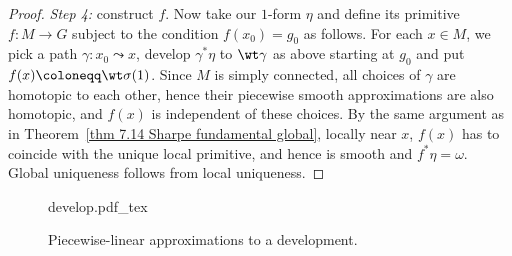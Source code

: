 \begin{proof}
    \emph{Step 4:} construct $f$. Now take our $1$-form $\eta$ and define its primitive $f:M\to G$ subject to the condition $f(x_0)=g_0$ as follows. For each $x\in M$, we pick a path $\gamma:x_0\leadsto x$, develop $\gamma^\ast\eta$ to $\wt\gamma$ as above starting at $g_0$ and put $f(x)\coloneqq \wt\sigma(1)$. Since $M$ is simply connected, all choices of $\gamma$ are homotopic to each other, hence their piecewise smooth approximations are also homotopic, and $f(x)$ is independent of these choices. By the same argument as in Theorem~\ref{thm 7.14 Sharpe fundamental global}, locally near $x$, $f(x)$ has to coincide with the unique local primitive, and hence is smooth and $f^\ast\eta=\omega$. Global uniqueness follows from local uniqueness.
\end{proof}

\begin{figure}[tp]
    \def\svgwidth{0.5\linewidth}
    \centering
    {develop.pdf_tex}
    \caption{Piecewise-linear approximations to a development.\label{fig:develop}}
\end{figure}

